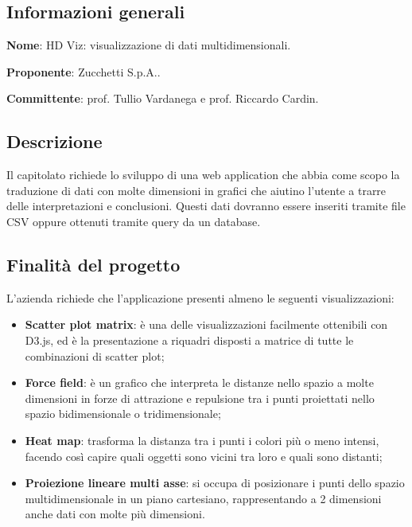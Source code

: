 \documentclass[../studio-di-fattibilita.tex]{subfiles}
\begin{document}
\subsection{Informazioni generali}%
\label{sub:c4_informazioni_generale}
\begin{description}
  \item \textbf{Nome}: HD Viz: visualizzazione di dati multidimensionali.
  \item \textbf{Proponente}: Zucchetti S.p.A..
  \item \textbf{Committente}: prof. Tullio Vardanega e prof. Riccardo Cardin.
\end{description}

\subsection{Descrizione}%
\label{sub:c4_descrizione}
Il capitolato richiede lo sviluppo di una web application che abbia come scopo la 
traduzione di dati con molte dimensioni in grafici che aiutino l’utente a trarre delle interpretazioni e conclusioni. Questi dati dovranno essere inseriti tramite file CSV oppure ottenuti tramite query da un database.

\subsection{Finalità del progetto}%
\label{sub:c4_finalita_del_progetto}
L’azienda richiede che l’applicazione presenti almeno le seguenti visualizzazioni:
\begin{itemize}
  \item \textbf{Scatter plot matrix}: è una delle visualizzazioni facilmente ottenibili con D3.js, ed è la presentazione a riquadri disposti a matrice di tutte le combinazioni di scatter plot;
  \item \textbf{Force field}: è un grafico che interpreta le distanze nello spazio a molte dimensioni in forze di attrazione e repulsione tra i punti proiettati nello spazio bidimensionale o tridimensionale;
  \item \textbf{Heat map}: trasforma la distanza tra i punti i colori più o meno intensi, facendo così capire quali oggetti sono vicini tra loro e quali sono distanti;
  \item \textbf{Proiezione lineare multi asse}: si occupa di posizionare i punti dello spazio multidimensionale in un piano cartesiano, rappresentando a 2 dimensioni anche dati con molte più dimensioni. 
\end{itemize}
\end{document}
